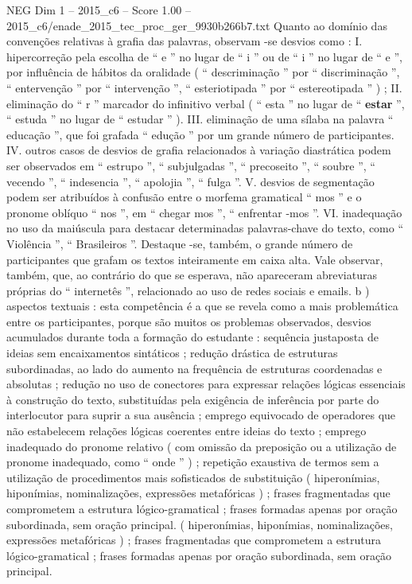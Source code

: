 \begin{textsample}{NEG Dim 1 – 2015\_c6 – Score 1.00 – 2015\_c6/enade\_2015\_tec\_proc\_ger\_9930b266b7.txt}
Quanto ao domínio das convenções relativas à grafia das palavras, observam -se desvios como : I. hipercorreção pela escolha de “ e ” no lugar de “ i ” ou de “ i ” no lugar de “ e ”, por influência de hábitos da oralidade ( “ descriminação ” por “ discriminação ”, “ entervenção ” por “ intervenção ”, “ esteriotipada ” por “ estereotipada ” ) ; II. eliminação do “ r ” marcador do infinitivo verbal ( “ esta ” no lugar de “ \textbf{estar} ”, “ estuda ” no lugar de “ estudar ” ).
III. eliminação de uma sílaba na palavra “ educação ”, que foi grafada “ edução ” por um grande número de participantes.
IV. outros casos de desvios de grafia relacionados à variação diastrática podem ser observados em “ estrupo ”, “ subjulgadas ”, “ precoseito ”, “ soubre ”, “ vecendo ”, “ indesencia ”, “ apolojia ”, “ fulga ”.
V. desvios de segmentação podem ser atribuídos à confusão entre o morfema gramatical “ mos ” e o pronome oblíquo “ nos ”, em “ chegar mos ”, “ enfrentar -mos ”.
VI. inadequação no uso da maiúscula para destacar determinadas palavras-chave do texto, como “ Violência ”, “ Brasileiros ”.
Destaque -se, também, o grande número de participantes que grafam os textos inteiramente em caixa alta.
Vale observar, também, que, ao contrário do que se esperava, não apareceram abreviaturas próprias do “ internetês ”, relacionado ao uso de redes sociais e emails. b ) aspectos textuais : esta competência é a que se revela como a mais problemática entre os participantes, porque são muitos os problemas observados, desvios acumulados durante toda a formação do estudante : sequência justaposta de ideias sem encaixamentos sintáticos ; redução drástica de estruturas subordinadas, ao lado do aumento na frequência de estruturas coordenadas e absolutas ; redução no uso de conectores para expressar relações lógicas essenciais à construção do texto, substituídas pela exigência de inferência por parte do interlocutor para suprir a sua ausência ; emprego equivocado de operadores que não estabelecem relações lógicas coerentes entre ideias do texto ; emprego inadequado do pronome relativo ( com omissão da preposição ou a utilização de pronome inadequado, como “ onde ” ) ; repetição exaustiva de termos sem a utilização de procedimentos mais sofisticados de substituição ( hiperonímias, hiponímias, nominalizações, expressões metafóricas ) ; frases fragmentadas que comprometem a estrutura lógico-gramatical ; frases formadas apenas por oração subordinada, sem oração principal. ( hiperonímias, hiponímias, nominalizações, expressões metafóricas ) ; frases fragmentadas que comprometem a estrutura lógico-gramatical ; frases formadas apenas por oração subordinada, sem oração principal.

\end{textsample}
